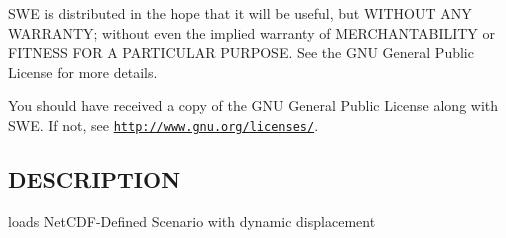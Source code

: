 S\-W\-E is distributed in the hope that it will be useful, but W\-I\-T\-H\-O\-U\-T A\-N\-Y W\-A\-R\-R\-A\-N\-T\-Y; without even the implied warranty of M\-E\-R\-C\-H\-A\-N\-T\-A\-B\-I\-L\-I\-T\-Y or F\-I\-T\-N\-E\-S\-S F\-O\-R A P\-A\-R\-T\-I\-C\-U\-L\-A\-R P\-U\-R\-P\-O\-S\-E. See the G\-N\-U General Public License for more details.

You should have received a copy of the G\-N\-U General Public License along with S\-W\-E. If not, see \href{http://www.gnu.org/licenses/}{\tt http\-://www.\-gnu.\-org/licenses/}.\hypertarget{NetCdfWriter_8hh_DESCRIPTION}{}\subsection{D\-E\-S\-C\-R\-I\-P\-T\-I\-O\-N}\label{NetCdfWriter_8hh_DESCRIPTION}
loads Net\-C\-D\-F-\/\-Defined Scenario with dynamic displacement 
